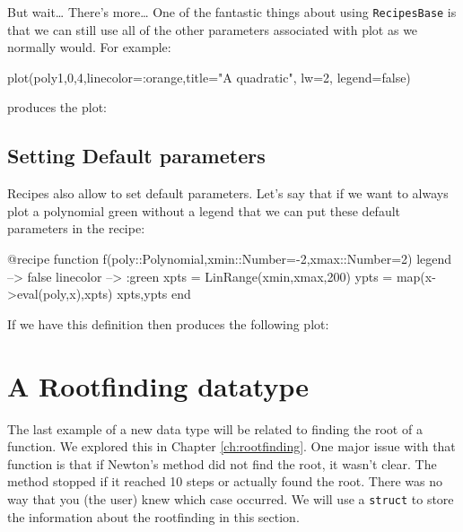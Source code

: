 But wait\ldots{} There's more\ldots{} One of the fantastic things about using \texttt{RecipesBase} is that we can still use all of the other parameters associated
with plot as we normally would. For example:

\begin{jlblock}[poly]
plot(poly1,0,4,linecolor=:orange,title="A quadratic", lw=2, legend=false)
\end{jlblock}
%
produces the plot:
%
\begin{center}
\pgfplotsset{scale=0.6}
\end{center}


\subsection{Setting Default parameters}

Recipes also allow to set default parameters. Let's say that if we want
to always plot a polynomial green without a legend that we can put these
default parameters in the recipe:

\begin{jlblock}[poly]
@recipe function f(poly::Polynomial,xmin::Number=-2,xmax::Number=2)
  legend --> false
  linecolor --> :green
  xpts = LinRange(xmin,xmax,200)
  ypts = map(x->eval(poly,x),xpts)
  xpts,ypts
end
\end{jlblock}

If we have this definition then  produces the following plot:

\begin{center}
\pgfplotsset{scale=0.6}
\end{center}

\section{A Rootfinding datatype}

The last example of a new data type will be related to finding the root of a function.  We explored this in Chapter \ref{ch:rootfinding}.  One major issue with that function is that if Newton's method did not find the root, it wasn't clear.  The method stopped if it reached 10 steps or actually found the root. There was no way that you (the user) knew which case occurred.  We will use a \texttt{struct} to store the information about the rootfinding in this section. 


